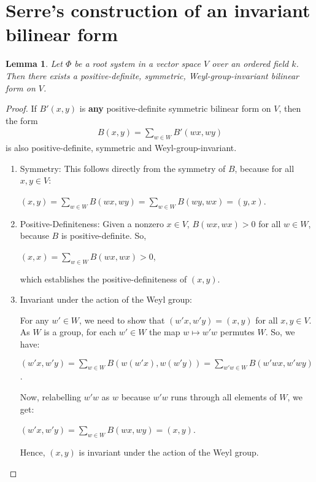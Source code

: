 \documentclass[12pt, a4paper]{article}
\newtheorem{lemma}{Lemma}[section]
\begin{document}
\section{Serre's construction of an invariant bilinear form}

\begin{lemma}
  Let $\Phi$ be a root system in a vector space $V$ over an ordered field $k$. Then there exists a
  positive-definite, symmetric, Weyl-group-invariant bilinear form on $V$.
\end{lemma}
\begin{proof}

  If $B'(x, y)$ is \textbf{any} positive-definite symmetric bilinear form on $V$, then the form
  \begin{align*}
    B(x, y) = \sum_{w \in W}B'(wx, wy)
  \end{align*}
  is also positive-definite, symmetric and Weyl-group-invariant.

  \begin{enumerate}
    \item Symmetry: This follows directly from the symmetry of $B$, because for all $x, y \in V$:

    $(x, y) = \sum_{w \in W} B(wx, wy) = \sum_{w \in W} B(wy, wx) = (y, x)$.

    \item Positive-Definiteness: Given a nonzero $x \in V$, $B(wx, wx) > 0$ for all $w \in W$,
    because $B$ is positive-definite. So,

    $(x, x) = \sum_{w \in W} B(wx, wx) > 0$,

    which establishes the positive-definiteness of $(x, y)$.

    \item Invariant under the action of the  Weyl group:

    For any $w' \in W$, we need to show that $(w'x, w'y) = (x, y)$ for all $x, y \in V$.
    As $W$ is a group, for each $w' \in W$ the map $w \mapsto w'w$ permutes $W$. So, we have:

    $(w'x, w'y) = \sum_{w \in W} B(w(w'x), w(w'y)) = \sum_{w'w \in W} B(w'wx, w'wy)$.

    Now, relabelling $w'w$ as $w$ because $w'w$ runs through all elements of $W$, we get:

    $(w'x, w'y) = \sum_{w \in W} B(wx, wy) = (x, y)$.

    Hence, $(x, y)$ is invariant under the action of the Weyl group.
  \end{enumerate}

\end{proof}
\end{document}
